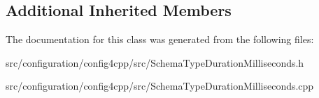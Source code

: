 \subsection*{Additional Inherited Members}


The documentation for this class was generated from the following files\-:\begin{DoxyCompactItemize}
\item 
src/configuration/config4cpp/src/Schema\-Type\-Duration\-Milliseconds.\-h\item 
src/configuration/config4cpp/src/Schema\-Type\-Duration\-Milliseconds.\-cpp\end{DoxyCompactItemize}
